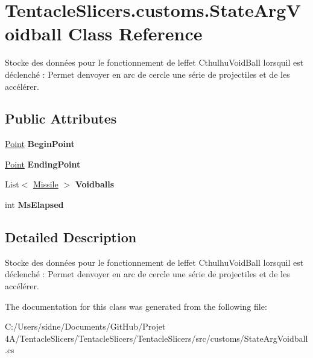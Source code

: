 \hypertarget{class_tentacle_slicers_1_1customs_1_1_state_arg_voidball}{}\section{Tentacle\+Slicers.\+customs.\+State\+Arg\+Voidball Class Reference}
\label{class_tentacle_slicers_1_1customs_1_1_state_arg_voidball}


Stocke des données pour le fonctionnement de l\textquotesingle{}effet Cthulhu\+Void\+Ball lorsqu\textquotesingle{}il est déclenché \+: Permet d\textquotesingle{}envoyer en arc de cercle une série de projectiles et de les accélérer.  


\subsection*{Public Attributes}
\begin{DoxyCompactItemize}
\item 
\mbox{\label{class_tentacle_slicers_1_1customs_1_1_state_arg_voidball_a8a6d2dc7e13f1e5f86188b550e4918dc}} 
\hyperlink{class_tentacle_slicers_1_1general_1_1_point}{Point} {\bfseries Begin\+Point}
\item 
\mbox{\label{class_tentacle_slicers_1_1customs_1_1_state_arg_voidball_a52df5202f60e0b559f604b718a670a3f}} 
\hyperlink{class_tentacle_slicers_1_1general_1_1_point}{Point} {\bfseries Ending\+Point}
\item 
\mbox{\label{class_tentacle_slicers_1_1customs_1_1_state_arg_voidball_a9c124472e41f93704059fa0d31a9a617}} 
List$<$ \hyperlink{class_tentacle_slicers_1_1actors_1_1_missile}{Missile} $>$ {\bfseries Voidballs}
\item 
\mbox{\label{class_tentacle_slicers_1_1customs_1_1_state_arg_voidball_a7dd08e539be9989dca879b92b1fbc611}} 
int {\bfseries Ms\+Elapsed}
\end{DoxyCompactItemize}


\subsection{Detailed Description}
Stocke des données pour le fonctionnement de l\textquotesingle{}effet Cthulhu\+Void\+Ball lorsqu\textquotesingle{}il est déclenché \+: Permet d\textquotesingle{}envoyer en arc de cercle une série de projectiles et de les accélérer. 



The documentation for this class was generated from the following file\+:\begin{DoxyCompactItemize}
\item 
C\+:/\+Users/sidne/\+Documents/\+Git\+Hub/\+Projet 4\+A/\+Tentacle\+Slicers/\+Tentacle\+Slicers/\+Tentacle\+Slicers/src/customs/State\+Arg\+Voidball.\+cs\end{DoxyCompactItemize}
